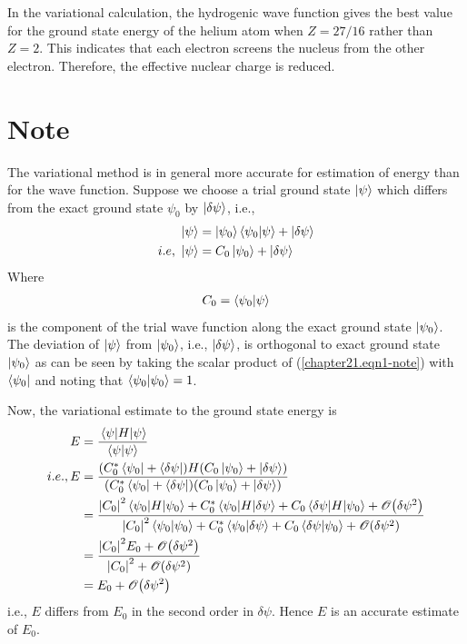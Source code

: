 	In the variational calculation, the hydrogenic wave function gives the best value for the ground state energy of the helium atom when  $Z=27/16$ rather than $Z=2$. This indicates that each electron screens the nucleus from the other electron. Therefore, the effective nuclear charge is reduced.
	
	
	\section{Note}
	The variational method is in general more accurate for estimation of energy than for the wave function. Suppose we choose a trial ground state $\ket{\psi}$ which differs from the exact ground state $\psi_0$ by $\ket{\delta \psi}$, i.e.,
	\begin{align}
		\label{chapter21.eqn1-note}
		\ket{\psi} &= \ket{\psi_0} \braket{\psi_0}{\psi} + \ket{\delta \psi}\\
		\label{chapter21.eqn2-note}
		i.e,\ \ket{\psi} &= C_0 \ket{\psi_0}  + \ket{\delta \psi}
	\end{align}
	Where
	\begin{align}
		\label{chapter21.eqn3-note}
		C_0 = \braket{\psi_0}{\psi}
	\end{align}
	is the component of the trial wave function along the exact ground state $\ket{\psi_0}$. The deviation of $\ket{\psi}$ from $\ket{\psi_0}$, i.e., $\ket{\delta \psi}$, is orthogonal to exact ground state $\ket{\psi_0}$ as can be seen by taking the scalar product of (\ref{chapter21.eqn1-note}) with $\bra{\psi_0}$ and noting that $\braket{\psi_0}{\psi_0} = 1$.
	
	
	Now, the variational estimate to the ground state energy is
	\begin{align*}
		E &= \frac{\expval{H}{\psi}}{\braket{\psi}{\psi}} \\
		i.e., E &= \frac{\qty(C^*_0 \bra{\psi_0} + \bra{\delta \psi})  H  \qty(C_0 \ket{\psi_0}  +  \ket{\delta \psi})}{\qty(C^*_0 \bra{\psi_0} + \bra{\delta \psi}) \qty(C_0 \ket{\psi_0}  +  \ket{\delta \psi})}\\
		&= \frac{\abs{C_0}^2 \expval{H}{\psi_0} + C^*_0 \mel{\psi_0}{H}{\delta\psi} + C_0 \mel{\delta\psi}{H}{\psi_0} + \order{\delta\psi^2}}
		{\abs{C_0}^2 \braket{\psi_0}{\psi_0} + C^*_0 \braket{\psi_0}{\delta\psi} + C_0 \braket{\delta\psi}{\psi_0} + \order{\delta\psi^2}} \\
		&= \frac{\abs{C_0}^2 E_0  +  \order{\delta\psi^2}}{\abs{C_0}^2  +  \order{\delta\psi^2}} \\
		&= E_0 + \order{\delta\psi^2}
	\end{align*}
	i.e., $E$ differs from $E_0$ in the second order in $\delta\psi$. Hence $E$ is an accurate estimate of $E_0$.
	
